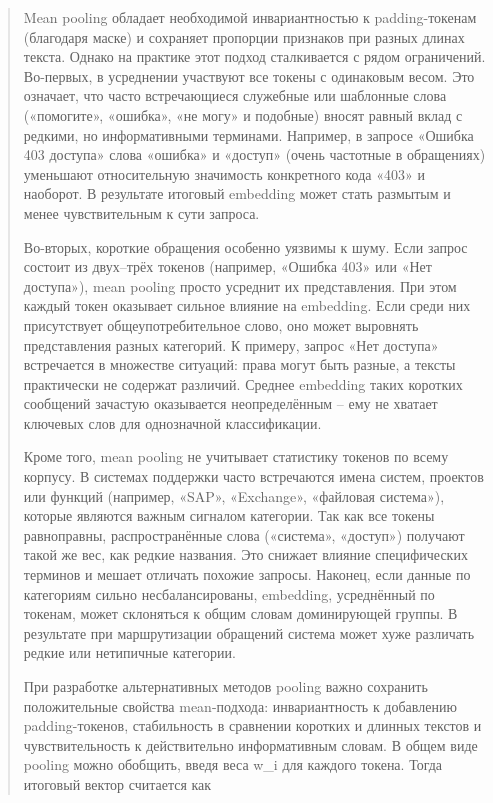 \begin{quote}
Mean pooling обладает необходимой инвариантностью к padding-токенам
(благодаря маске) и сохраняет пропорции признаков при разных длинах
текста. Однако на практике этот подход сталкивается с рядом ограничений.
Во-первых, в усреднении участвуют все токены с одинаковым весом. Это
означает, что часто встречающиеся служебные или шаблонные слова
(«помогите», «ошибка», «не могу» и подобные) вносят равный вклад с
редкими, но информативными терминами. Например, в запросе «Ошибка 403
доступа» слова «ошибка» и «доступ» (очень частотные в обращениях)
уменьшают относительную значимость конкретного кода «403» и наоборот. В
результате итоговый embedding может стать размытым и менее
чувствительным к сути запроса.

Во-вторых, короткие обращения особенно уязвимы к шуму. Если запрос
состоит из двух--трёх токенов (например, «Ошибка 403» или «Нет
доступа»), mean pooling просто усреднит их представления. При этом
каждый токен оказывает сильное влияние на embedding. Если среди них
присутствует общеупотребительное слово, оно может выровнять
представления разных категорий. К примеру, запрос «Нет доступа»
встречается в множестве ситуаций: права могут быть разные, а тексты
практически не содержат различий. Среднее embedding таких коротких
сообщений зачастую оказывается неопределённым -- ему не хватает ключевых
слов для однозначной классификации.

Кроме того, mean pooling не учитывает статистику токенов по всему
корпусу. В системах поддержки часто встречаются имена систем, проектов
или функций (например, «SAP», «Exchange», «файловая система»), которые
являются важным сигналом категории. Так как все токены равноправны,
распространённые слова («система», «доступ») получают такой же вес, как
редкие названия. Это снижает влияние специфических терминов и мешает
отличать похожие запросы. Наконец, если данные по категориям сильно
несбалансированы, embedding, усреднённый по токенам, может склоняться к
общим словам доминирующей группы. В результате при маршрутизации
обращений система может хуже различать редкие или нетипичные категории.

При разработке альтернативных методов pooling важно сохранить
положительные свойства mean-подхода: инвариантность к добавлению
padding-токенов, стабильность в сравнении коротких и длинных текстов и
чувствительность к действительно информативным словам. В общем виде
pooling можно обобщить, введя веса w\_i для каждого токена. Тогда
итоговый вектор считается как
\end{quote}

